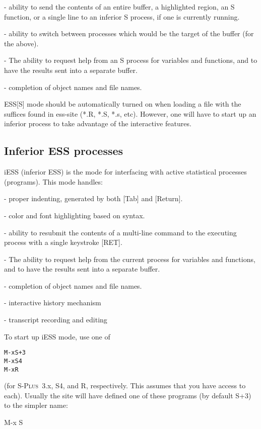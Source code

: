 \documentclass{article}
\newcommand*{\Splus}{\textsc{S-Plus}}
\newenvironment{Salltt}{\small\begin{alltt}}{\end{alltt}}
\begin{document}
- ability to send the contents of an entire buffer, a highlighted
  region, an S function, or a single line to an inferior S process, if
  one is currently running.

- ability to switch between processes which would be the target of the 
  buffer (for the above).

- The ability to request help from an S process for variables and
  functions, and to have the results sent into a separate buffer.

- completion of object names and file names.

ESS[S] mode should be automatically turned on when loading a file with
the suffices found in ess-site (*.R, *.S, *.s, etc).  However, one
will have to start up an inferior process to take advantage of the
interactive features.


\subsection{Inferior ESS processes}
\label{sec:S:inf}

iESS (inferior ESS) is the mode for interfacing with active
statistical processes (programs).  This mode handles:

- proper indenting, generated by both [Tab] and [Return].

- color and font highlighting based on syntax.

- ability to resubmit the contents of a multi-line command
  to the executing process with a single keystroke [RET].

- The ability to request help from the current process for variables
  and functions, and to have the results sent into a separate buffer.

- completion of object names and file names.

- interactive history mechanism

- transcript recording and editing

To start up iESS mode, use one of
\begin{Salltt}
   M-x S+3 
   M-x S4
   M-x R
\end{Salltt}
(for \Splus~3.x, S4, and R, respectively.  This assumes that you have
access to each).  Usually the site will have defined one of these programs
(by default S+3) to the simpler name:

   M-x S

\end{document}
